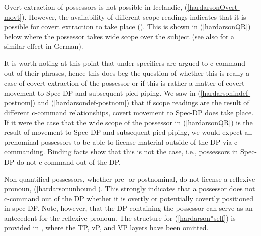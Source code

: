 \documentclass[output=paper]{langscibook}
\begin{document}
\noindent Overt extraction of possessors is not possible in Icelandic, (\ref{hardarsonOvert-movt}). However, the availability of different scope readings indicates that it is possible for covert extraction to take place (\citealt{Hardarson:2016wd}). This is shown in (\ref{hardarsonQR}) below where the possessor takes wide scope over the subject (see also \citealt{Wurmbrand:2008wc,Bobaljik:va} for a similar effect in German).

\begin{exe}
\end{exe}

\noindent It is worth noting at this point that under \citet[22ff]{Kayne:1994uo} specifiers are argued to c-command out of their phrases, hence this does beg the question of whether this is really a case of covert extraction of the possessor or if this is rather a matter of covert movement to Spec-DP and subsequent pied piping. We saw in (\ref{hardarsonindef-postnom}) and (\ref{hardarsondef-postnom}) that if scope readings are the result of different c-command relationships, covert movement to Spec-DP does take place. If it were the case that the wide scope of the possessor in (\ref{hardarsonQR}) is the result of movement to Spec-DP and subsequent pied piping, we would expect all prenominal possessors to be able to license material outside of the DP via c-commanding. Binding facts show that this is not the case, i.e., possessors in Spec-DP do not c-command out of the DP.

Non-quantified possessors, whether pre- or postnominal, do not license a reflexive pronoun, (\ref{hardarsonunbound}). This strongly indicates that a possessor does not c-com\-mand out of the DP whether it is overtly or potentially covertly positioned in spec-DP. Note, however, that the DP containing the possessor can serve as an antecedent for the reflexive pronoun. The structure for (\ref{hardarson*self}) is provided in , where the TP, vP, and VP layers have been omitted.
\end{document}
